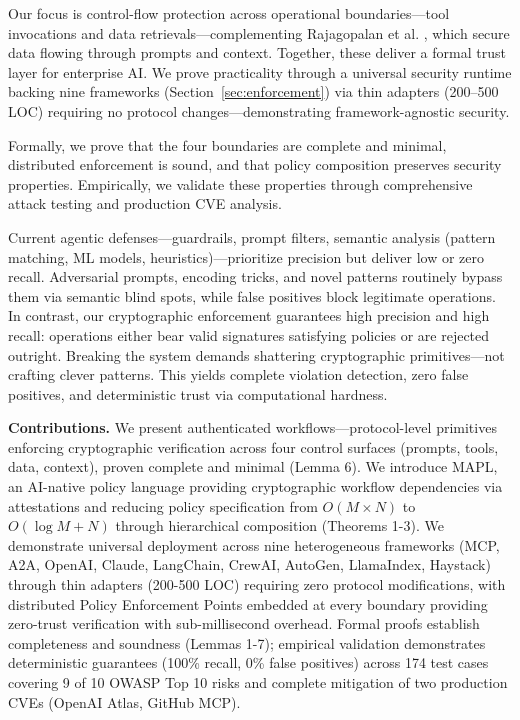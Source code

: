 Our focus is control-flow protection across operational boundaries—tool invocations and data retrievals—complementing Rajagopalan et al. \cite{rajagopalan2025prompts}, which secure data flowing through prompts and context. Together, these deliver a formal trust layer for enterprise AI. We prove practicality through a universal security runtime backing nine frameworks (Section~\ref{sec:enforcement}) via thin adapters (200–500 LOC) requiring no protocol changes—demonstrating framework-agnostic security.

Formally, we prove that the four boundaries are complete and minimal, distributed enforcement is sound, and that policy composition preserves security properties.
Empirically, we validate these properties through comprehensive attack testing and production CVE analysis.

Current agentic defenses—guardrails, prompt filters, semantic analysis (pattern matching, ML models, heuristics)—prioritize precision but deliver low or zero recall. Adversarial prompts, encoding tricks, and novel patterns routinely bypass them via semantic blind spots, while false positives block legitimate operations.
In contrast, our cryptographic enforcement guarantees high precision and high recall: operations either bear valid signatures satisfying policies or are rejected outright. Breaking the system demands shattering cryptographic primitives—not crafting clever patterns. This yields complete violation detection, zero false positives, and deterministic trust via computational hardness.


\noindent\textbf{Contributions.}
We present authenticated workflows—protocol-level primitives enforcing cryptographic verification across four control surfaces (prompts, tools, data, context), proven complete and minimal (Lemma 6). We introduce MAPL, an AI-native policy language providing cryptographic workflow dependencies via attestations and reducing policy specification from $O(M \times N)$ to $O(\log M + N)$ through hierarchical composition (Theorems 1-3). We demonstrate universal deployment across nine heterogeneous frameworks (MCP, A2A, OpenAI, Claude, LangChain, CrewAI, AutoGen, LlamaIndex, Haystack) through thin adapters (200-500 LOC) requiring zero protocol modifications, with distributed Policy Enforcement Points embedded at every boundary providing zero-trust verification with sub-millisecond overhead. Formal proofs establish completeness and soundness (Lemmas 1-7); empirical validation demonstrates deterministic guarantees (100\% recall, 0\% false positives) across 174 test cases covering 9 of 10 OWASP Top 10 risks and complete mitigation of two production CVEs (OpenAI Atlas, GitHub MCP).
